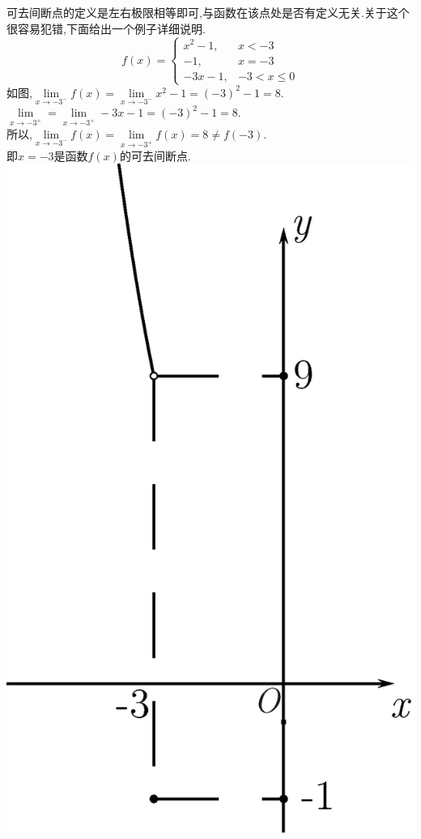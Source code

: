 \begin{tcolorbox}[sidebyside,colframe=red!75!black, colback=yellow!10!white,title=注意,sidebyside align=top seam,
	righthand width=4cm,fonttitle =\CJKfamily{heiti}]
	\kg 可去间断点的定义是左右极限相等即可,与函数在该点处是否有定义无关.关于这个很容易犯错,下面给出一个例子详细说明.
	\[
	f(x)=
	\begin{cases}
	x^2-1,&x<-3\\
	-1,&x=-3\\
	-3x-1,&-3<x\le 0
	\end{cases}
	\]
	如图,$\lim\limits_{x \to -3^-}f(x)=\lim\limits_{x \to -3^-}x^2-1=(-3)^2-1=8.$\\[0.5em]
	$\lim\limits_{x \to -3^+}=\lim\limits_{x \to -3^+}-3x-1=(-3)^2-1=8.$\\[0.5em]
	所以,$\lim\limits_{x \to -3^-}f(x)=\lim\limits_{x \to -3^+}f(x)=8 \neq f(-3).$\\[0.5em]
	即$x=-3$是函数$f(x)$的可去间断点.
	\tcblower
	\centering
	\vspace*{1cm}
	\includegraphics[width=\linewidth]{pictures/C-1/可去间断点.eps}
\end{tcolorbox}

